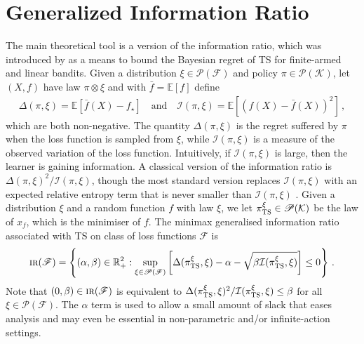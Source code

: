 \documentclass[letter, 12pt]{report}
\newcommand{\R}{\mathbb R}
\newcommand{\E}{\mathbb E}
\newcommand{\cK}{\mathcal K}
\newcommand{\sF}{\mathscr F}
\newcommand{\sP}{\mathscr P}
\newcommand{\I}{\mathcal{I}}
\newcommand{\1}{\mathbf{1}}
\newcommand{\IR}{\operatorname{\textsc{ir}}}
\newcommand{\ts}{\textsc{TS}\xspace}
\theoremstyle{plain}
\theoremstyle{definition}
\theoremstyle{remark}
\begin{document}
\chapter{Generalized Information Ratio}\label{ch:gir}
The main theoretical tool is a version of the information ratio, which was introduced by \cite{RV16} as a means to bound the Bayesian regret of
\ts for finite-armed and linear bandits.
Given a distribution $\xi \in \sP(\sF)$ and policy $\pi \in \sP(\cK)$, let $(X, f)$ have law $\pi \otimes \xi$ and with $\bar f = \E[f]$ define
\begin{align*}
    \Delta(\pi, \xi) = \E\left[\bar f(X) - f_\star\right] \quad \text{and} \quad
    \I(\pi, \xi) = \E\left[(f(X) - \bar f(X))^2\right]\,,
\end{align*}
which are both non-negative.
The quantity $\Delta(\pi, \xi)$ is the regret suffered by $\pi$ when the loss function is sampled from $\xi$, while $\I(\pi, \xi)$ is a measure of the observed variation
of the loss function. Intuitively, if $\I(\pi, \xi)$ is large, then the learner is gaining information.
A classical version of the information ratio is $\Delta(\pi, \xi)^2 / \I(\pi, \xi)$, though the most standard version replaces $\I(\pi, \xi)$ with
an expected relative entropy term that is never smaller than $\I(\pi, \xi)$ \citep{RV16}.
Given a distribution $\xi$ and a random function $f$ with law $\xi$, we let $\pi^\xi_\ts \in \sP(\cK)$ be the law of $x_f$, which is the minimiser of $f$.
The minimax generalised information ratio associated with \ts on class of loss functions $\sF$ is
\begin{align*}
    \IR(\sF) = \left\{(\alpha, \beta) \in \R_+^2 : \sup_{\xi \in \sP(\sF)} \left[\Delta(\pi^\xi_\ts, \xi) - \alpha - \sqrt{\beta \I(\pi^\xi_\ts, \xi)}\right] \leq 0 \right\} \,.
\end{align*}
Note that $(0, \beta) \in \IR(\sF)$ is equivalent to $\Delta(\pi_\ts^\xi, \xi)^2 / \I(\pi_\ts^\xi, \xi) \leq \beta$ for all $\xi \in \sP(\sF)$.
The $\alpha$ term is used to allow a small amount of slack that eases analysis and may even be essential in non-parametric and/or infinite-action settings.
\end{document}

